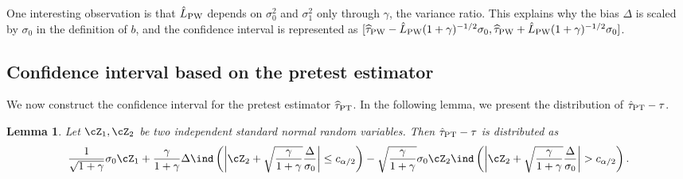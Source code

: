 \documentclass[11pt]{article}
\newcommand{\htau}{\widehat\tau}
\numberwithin{equation}{section}
\newtheorem{lemma}{Lemma}[section]
\theoremstyle{definition}
\begin{document}
One interesting observation is that $\hat{L}_{\rm PW}$ depends on $\sigma_0^2$ and $\sigma_1^2$ only through $\gamma$, the variance ratio. This explains why the bias $\Delta$ is scaled by $\sigma_0$ in the definition of $b$, and the confidence interval is represented as $[\htau_{\rm PW} - \hat{L}_{\rm PW} (1+\gamma)^{-1/2} \sigma_0, \htau_{\rm PW} + \hat{L}_{\rm PW} (1+\gamma)^{-1/2} \sigma_0]$.



\subsection{Confidence interval based on the pretest estimator}


We now construct the confidence interval for the pretest estimator $\htau_{\rm PT}$. In the following lemma, we present the distribution of $\hat\tau_{\rm PT} - \tau$. 

\begin{lemma}\label{lemma:clt_PT}
  Let $\cZ_1, \cZ_2$ be two independent standard normal random variables. Then $\hat\tau_{\rm PT} - \tau$ is distributed as
\begin{align*}
  \frac{1}{\sqrt{1+\gamma}}\sigma_0\cZ_1 +  \frac{\gamma}{1+\gamma} \Delta\ind\left(\left\lvert \cZ_2 + \sqrt{\frac{\gamma}{1+\gamma}}\frac{\Delta}{\sigma_0}\right\rvert \le c_{\alpha/2}\right) - \sqrt{\frac{\gamma}{1+\gamma}}\sigma_0\cZ_2\ind\left(\left\lvert \cZ_2 + \sqrt{\frac{\gamma}{1+\gamma}}\frac{\Delta}{\sigma_0}\right\rvert > c_{\alpha/2}\right).
\end{align*} 
\end{lemma}
\end{document}
